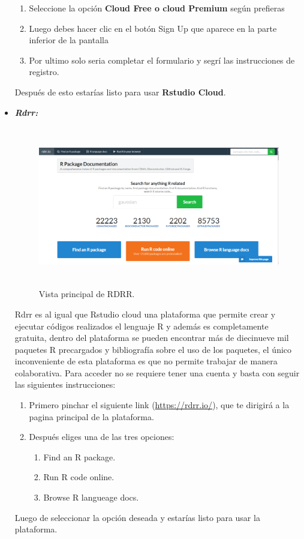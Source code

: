 \documentclass{article}
\begin{document}
\begin{itemize}
\begin{enumerate}
    \item Seleccione la opción \textbf{Cloud Free o cloud Premium} según prefieras
    \item Luego debes hacer clic en el botón Sign Up que aparece en la parte inferior de la pantalla
    \item Por ultimo solo seria completar el formulario  y segrí las instrucciones de registro.
\end{enumerate}
Después de esto estarías listo para usar \textbf{Rstudio Cloud}.
\item \textbf{\textit{Rdrr: }}
\begin{figure}[H]
\centering
\includegraphics[width=12cm,height=7cm]{imagenes/RDRR.png}
\caption{\label{fig1:frog}Vista principal de RDRR.}
\end{figure}
Rdrr es al igual que Rstudio cloud una plataforma que permite crear y ejecutar códigos realizados el lenguaje R y además es completamente gratuita, dentro del plataforma se pueden encontrar más de diecinueve mil paquetes R precargados y bibliografía sobre el uso de los paquetes, el único inconveniente de esta plataforma es que no permite trabajar de manera colaborativa.
Para acceder no se requiere tener una cuenta y basta con seguir las siguientes instrucciones:   
\begin{enumerate}
    \item Primero pinchar el siguiente link (\url{https://rdrr.io/}), que te dirigirá a la pagina principal de la plataforma.
    \item Después eliges una de las tres opciones:
    \begin{enumerate}
        \item Find an R package.
        \item Run R code online.
        \item Browse R langueage docs.
    \end{enumerate}
\end{enumerate}
Luego de seleccionar la opción deseada y estarías listo para usar la plataforma.


\end{itemize}
\end{document}
